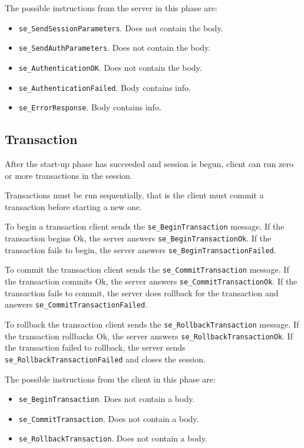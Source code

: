 \documentclass[a4paper,12pt]{article}
\begin{document}
The possible instructions from the server in this phase are:
\begin{itemize}
\item \verb!se_SendSessionParameters!. Does not contain the body.
\item \verb!se_SendAuthParameters!. Does not contain the body.
\item \verb!se_AuthenticationOK!. Does not contain the body.
\item \verb!se_AuthenticationFailed!. Body contains info.
\item \verb!se_ErrorResponse!. Body contains info.
\end{itemize}

\subsection{Transaction}

After the start-up phase has succeeded and session is begun, client can run zero or more transactions in the session.

Transactions must be run sequentially, that is the client must commit a transaction before starting a new one.

To begin a transaction client sends the \verb!se_BeginTransaction! message. If the transaction begins Ok, the server answers \verb!se_BeginTransactionOk!. If the transaction fails to begin, the server answers \verb!se_BeginTransactionFailed!.

To commit the transaction client sends the \verb!se_CommitTransaction! message. If the transaction commits Ok, the server answers \verb!se_CommitTransactionOk!. If the transaction fails to commit, the server does rollback for the transaction and answers \verb!se_CommitTransactionFailed!.

To rollback the transaction client sends the \verb!se_RollbackTransaction! message. If the transaction rollbacks Ok, the server answers \verb!se_RollbackTransactionOk!. If the transaction failed to rollback, the server sends \verb!se_RollbackTransactionFailed! and closes the session.

The possible instructions from the client in this phase are:
\begin{itemize}
\item \verb!se_BeginTransaction!. Does not contain a body.
\item \verb!se_CommitTransaction!. Does not contain a body.
\item \verb!se_RollbackTransaction!. Does not contain a body.
\end{itemize}
\end{document}

